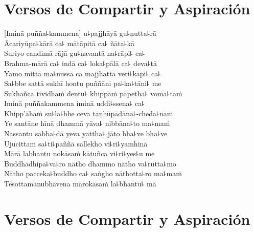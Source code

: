 \chapter*[Compartir y Aspiración]{Versos de Compartir y Aspiración}

\delegateSetUseNext

\begin{leader}
\end{leader}


[Iminā puñña꜕kammena] u꜕pajjhāyā gu꜕ṇutta꜕rā\\
Ācariyūpa꜕kārā ca꜕ mātāpitā ca꜕ ñāta꜕kā\\
Suriyo candimā rājā gu꜕ṇavantā na꜕rāpi꜕ ca꜕\\
Brahma-mārā ca꜕ indā ca꜕ loka꜕pālā ca꜕ deva꜕tā\\
Yamo mittā ma꜕nussā ca majjhattā veri꜕kāpi꜕ ca꜕\\
Sa꜕bbe sattā sukhī hontu puññāni pa꜕ka꜕tāni꜕ me\\
Sukhañca tividhaṁ dentu꜕ khippaṁ pāpetha꜕ voma꜕taṁ\\
Iminā puññakammena iminā uddi꜕ssena꜕ ca꜕\\
Khipp'āhaṁ su꜕la꜕bhe ceva taṇhūpādāna꜕-cheda꜕naṁ\\
Ye santāne hīnā dhammā yāva꜕ nibbāna꜕to ma꜕maṁ\\
Nassantu sabba꜕dā yeva yattha꜕ jāto bha꜕ve bha꜕ve\\
Ujucittaṁ sa꜕ti꜕paññā sallekho vi꜕ri꜕yamhinā\\
Mārā labhantu nokāsaṁ kātuñca vi꜕ri꜕yes꜕u me\\
Buddhādhipa꜕va꜕ro nātho dhammo nātho va꜕rutta꜕mo\\
Nātho pacceka꜕buddho ca꜕ saṅgho nāthotta꜕ro ma꜕maṁ\\
Tesottamānubhāvena mārokāsaṁ la꜕bhantu꜕ mā

\chapter[Compartir y Aspiración]{Versos de Compartir y Aspiración}

\enlargethispage{2\baselineskip}

\begin{leader}
\end{leader}


